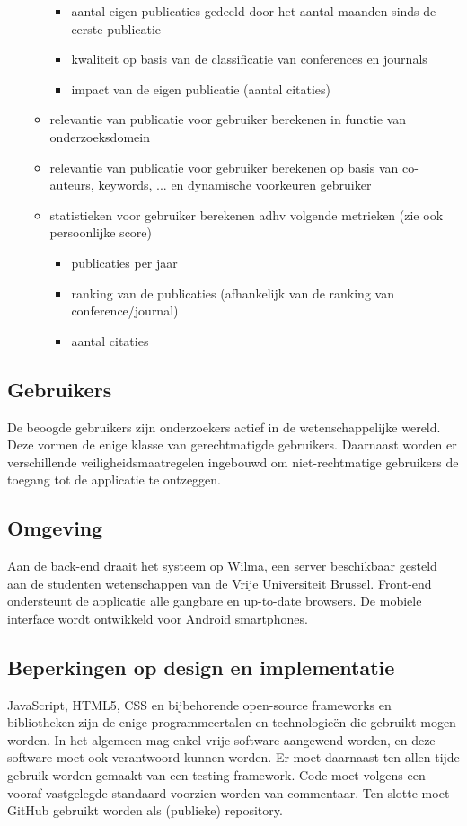 \documentclass{article}
\begin{document}
\begin{itemize}
\begin{itemize}
    	\begin{itemize}
    		\item aantal eigen publicaties gedeeld door het aantal maanden sinds de eerste publicatie
   		 \item kwaliteit op basis van de classificatie van conferences en journals
    		\item impact van de eigen publicatie (aantal citaties)
    	\end{itemize}
    \item relevantie van publicatie voor gebruiker berekenen in functie van onderzoeksdomein 
    \item relevantie van publicatie voor gebruiker berekenen op basis van co-auteurs, keywords, ... en dynamische voorkeuren gebruiker 
    \item statistieken voor gebruiker berekenen adhv volgende metrieken (zie ook persoonlijke score)
      	\begin{itemize}
    		\item publicaties per jaar
   		 \item ranking van de publicaties (afhankelijk van de ranking van conference/journal)
    		\item aantal citaties
    	\end{itemize}
    \end{itemize}
\end{itemize}




\subsection{Gebruikers}
De beoogde gebruikers zijn onderzoekers actief in de wetenschappelijke wereld. Deze vormen de enige klasse van gerechtmatigde gebruikers. Daarnaast worden er verschillende veiligheidsmaatregelen ingebouwd om niet-rechtmatige gebruikers de toegang tot de applicatie te ontzeggen. 

\subsection{Omgeving}
Aan de back-end draait het systeem op Wilma, een server beschikbaar gesteld aan de studenten wetenschappen van de Vrije Universiteit Brussel.  Front-end ondersteunt de applicatie alle gangbare en up-to-date browsers. De mobiele interface wordt ontwikkeld voor Android smartphones.

\subsection{Beperkingen op design en implementatie}
JavaScript, HTML5, CSS en bijbehorende open-source frameworks en bibliotheken zijn de enige programmeertalen en technologie\"{e}n die gebruikt mogen worden. In het algemeen mag enkel vrije software aangewend worden, en deze software moet ook verantwoord kunnen worden. Er moet daarnaast ten allen tijde gebruik worden gemaakt van een testing framework. Code moet volgens een vooraf vastgelegde standaard voorzien worden van commentaar. Ten slotte moet GitHub gebruikt worden als (publieke) repository. 
\end{document}
